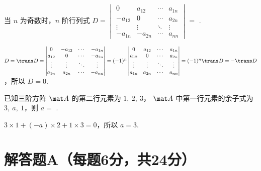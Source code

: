 \begin{problem}
  当 $n$ 为奇数时，$n$ 阶行列式 $D =
  \begin{vmatrix}
    0       & a_{12}  & \cdots & a_{1n}\\
    -a_{12} & 0       & \cdots & a_{2n}\\
    \vdots  & \vdots  & \ddots & \vdots \\
    -a_{1n} & -a_{2n} & \cdots & a_{nn}
  \end{vmatrix} = $
  .
\end{problem}
\begin{solution}
  $ D = \trans D =
    \begin{vmatrix}
      0      & -a_{12} & \cdots & -a_{1n}\\
      a_{12} & 0       & \cdots & -a_{2n}\\
      \vdots & \vdots  & \ddots & \vdots \\
      a_{1n} & a_{2n}  & \cdots & -a_{nn}
    \end{vmatrix} = (-1)^n
    \begin{vmatrix}
      0      & a_{12} & \cdots & a_{1n}\\
      a_{12} & 0      & \cdots & a_{2n}\\
      \vdots & \vdots & \ddots & \vdots \\
      a_{1n} & a_{2n} & \cdots & a_{nn}
    \end{vmatrix} = (-1)^n \trans D = -\trans D$，所以 $D = 0$.
\end{solution}

\begin{problem}
  已知三阶方阵 $\mat A$ 的第二行元素为 $1,~ 2,~ 3$，
  $\mat A$ 中第一行元素的余子式为 $3,~ a,~ 1$，则 $a = $ .
\end{problem}
\begin{solution}
  $3 \times 1 + (-a) \times 2 + 1 \times 3 = 0$，所以 $a = 3$.
\end{solution}

\section{解答题A（每题6分，共24分）}

